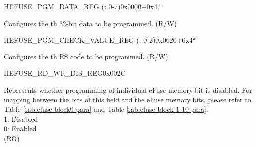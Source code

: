 \begin{register}{H}{EFUSE\_PGM\_DATA\_REG (: 0-7)}{0x0000+0x4*}\label{regdesc:EFUSEPGMDATANREG}
%
\regnewline%

\begin{regdesc}\begin{reglist}
\label{fielddesc:EFUSEPGMDATAN}\item [EFUSE\_PGM\_DATA\_\regindex{n}] Configures the th 32-bit data to be programmed. (R/W)
\end{reglist}\end{regdesc}
\end{register}


\begin{register}{H}{EFUSE\_PGM\_CHECK\_VALUE\_REG (: 0-2)}{0x0020+0x4*}\label{regdesc:EFUSEPGMCHECKVALUENREG}
%
\regnewline%
\begin{regdesc}\begin{reglist}
\label{fielddesc:EFUSEPGMRSDATAN}\item [EFUSE\_PGM\_RS\_DATA\_\regindex{n}] Configures the th RS code to be programmed. (R/W)
\end{reglist}\end{regdesc}
\end{register}


\begin{register}{H}{EFUSE\_RD\_WR\_DIS\_REG}{0x002C}\label{regdesc:EFUSERDWRDISREG}
%
\regnewline%
\begin{regdesc}\begin{reglist}
\label{fielddesc:EFUSEWRDIS}\item [EFUSE\_WR\_DIS] Represents whether programming of individual eFuse memory bit is disabled.  For mapping between the bits of this field and the eFuse memory bits, please refer to Table \ref{tab:efuse-block0-para} and Table \ref{tab:efuse-block-1-10-para}.\\
1: Disabled\\
0: Enabled\\
(RO)
\end{reglist}\end{regdesc}
\end{register}


